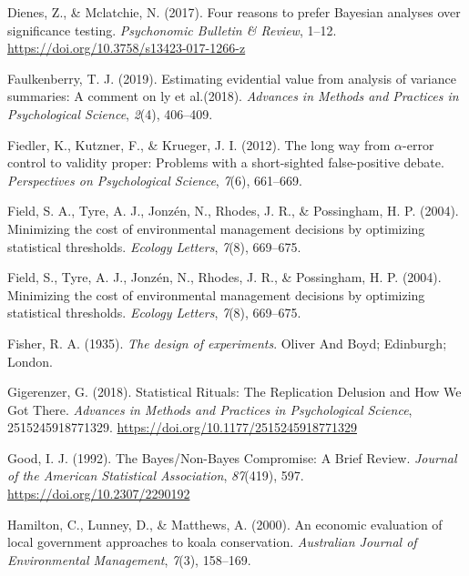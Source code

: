 \documentclass[
  english,
  ,jou,floatsintext]{apa6}
\newlength{\cslhangindent}
\newenvironment{cslreferences}%
  {\setlength{\parindent}{0pt}%
  \everypar{\setlength{\hangindent}{\cslhangindent}}\ignorespaces}%
  {\par}
\begin{document}
\begin{cslreferences}
\leavevmode\hypertarget{ref-dienes_four_2017}{}%
Dienes, Z., \& Mclatchie, N. (2017). Four reasons to prefer Bayesian analyses over significance testing. \emph{Psychonomic Bulletin \& Review}, 1--12. \url{https://doi.org/10.3758/s13423-017-1266-z}

\leavevmode\hypertarget{ref-faulkenberry2019estimating}{}%
Faulkenberry, T. J. (2019). Estimating evidential value from analysis of variance summaries: A comment on ly et al.(2018). \emph{Advances in Methods and Practices in Psychological Science}, \emph{2}(4), 406--409.

\leavevmode\hypertarget{ref-fiedler2012long}{}%
Fiedler, K., Kutzner, F., \& Krueger, J. I. (2012). The long way from \(\alpha\)-error control to validity proper: Problems with a short-sighted false-positive debate. \emph{Perspectives on Psychological Science}, \emph{7}(6), 661--669.

\leavevmode\hypertarget{ref-field_minimizing_2004}{}%
Field, S. A., Tyre, A. J., Jonzén, N., Rhodes, J. R., \& Possingham, H. P. (2004). Minimizing the cost of environmental management decisions by optimizing statistical thresholds. \emph{Ecology Letters}, \emph{7}(8), 669--675.

\leavevmode\hypertarget{ref-field2004minimizing}{}%
Field, S., Tyre, A. J., Jonzén, N., Rhodes, J. R., \& Possingham, H. P. (2004). Minimizing the cost of environmental management decisions by optimizing statistical thresholds. \emph{Ecology Letters}, \emph{7}(8), 669--675.

\leavevmode\hypertarget{ref-fisher_design_1935}{}%
Fisher, R. A. (1935). \emph{The design of experiments}. Oliver And Boyd; Edinburgh; London.

\leavevmode\hypertarget{ref-gigerenzer_statistical_2018}{}%
Gigerenzer, G. (2018). Statistical Rituals: The Replication Delusion and How We Got There. \emph{Advances in Methods and Practices in Psychological Science}, 2515245918771329. \url{https://doi.org/10.1177/2515245918771329}

\leavevmode\hypertarget{ref-good_bayesux2fnon-bayes_1992}{}%
Good, I. J. (1992). The Bayes/Non-Bayes Compromise: A Brief Review. \emph{Journal of the American Statistical Association}, \emph{87}(419), 597. \url{https://doi.org/10.2307/2290192}

\leavevmode\hypertarget{ref-hamilton2000economic}{}%
Hamilton, C., Lunney, D., \& Matthews, A. (2000). An economic evaluation of local government approaches to koala conservation. \emph{Australian Journal of Environmental Management}, \emph{7}(3), 158--169.


\end{cslreferences}
\end{document}
